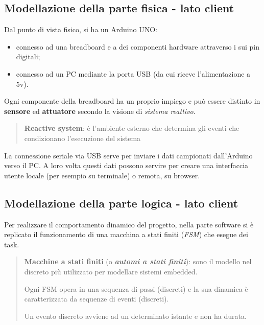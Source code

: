 \subsection{Modellazione della parte fisica - lato client}
Dal punto di vista fisico, si ha un Arduino UNO:
\begin{itemize}
	\item connesso ad una breadboard e a dei componenti hardware attraverso i sui pin digitali;
	\item connesso ad un PC mediante la porta USB (da cui riceve l'alimentazione a 5v). 
\end{itemize}
Ogni componente della breadboard ha un proprio impiego e può essere distinto in \textbf{sensore} ed \textbf{attuatore} secondo la visione di \textit{sistema reattivo}.
	\begin{quote}
		\textbf{Reactive system}: è l’ambiente esterno che determina gli eventi che	condizionano l’esecuzione del sistema
	\end{quote}	
La connessione seriale via USB serve per inviare i dati campionati dall'Arduino verso il PC. A loro volta questi dati possono servire per creare una interfaccia utente locale (per esempio su terminale) o remota, su browser.

\subsection{Modellazione della parte logica - lato client}
Per realizzare il comportamento dinamico del progetto, nella parte software si è replicato il funzionamento di una macchina a stati finiti (\textit{FSM}) che esegue dei task.

	\begin{quote}
		\textbf{Macchine a stati finiti} (o \textbf{\textit{automi a stati finiti}}): sono il modello nel discreto più utilizzato per modellare sistemi embedded.
		
		Ogni FSM opera in una sequenza di passi (discreti) e la sua dinamica è caratterizzata da sequenze di eventi (discreti).
		
		Un evento discreto avviene ad un determinato istante e non ha durata.
	\end{quote}
	
